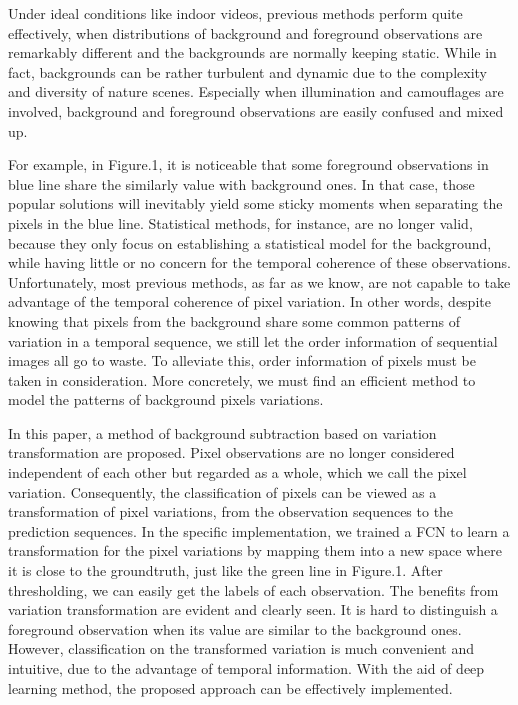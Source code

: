 \documentclass[journal]{IEEEtran}
\begin{document}
Under ideal conditions like indoor videos, previous methods perform quite effectively, when distributions of background and foreground observations are remarkably different and the backgrounds are normally keeping static. 
While in fact, backgrounds can be rather turbulent and dynamic due to the complexity and diversity of nature scenes. 
Especially when illumination and camouflages are involved, background and foreground observations are easily confused and mixed up. 


For example, in Figure.1, it is noticeable that some foreground observations in blue line share the similarly value with background ones. 
In that case, those popular solutions will inevitably yield some sticky moments when separating the pixels in the blue line. 
Statistical methods, for instance, are no longer valid, because they only focus on establishing a statistical model for the background, while having little or no concern for the temporal coherence of these observations. 
Unfortunately, most previous methods, as far as we know, are not capable to take advantage of the temporal coherence of pixel variation. 
In other words, despite knowing that pixels from the background share some common patterns of variation in a temporal sequence, we still let the order information of sequential images all go to waste. 
To alleviate this, order information of pixels must be taken in consideration. 
More concretely, we must find an efficient method to model the patterns of background pixels variations.

In this paper, a method of background subtraction based on variation transformation are proposed. 
Pixel observations are no longer considered independent of each other but regarded as a whole, which we call the pixel variation. 
Consequently, the classification of pixels can be viewed as a transformation of pixel variations, from the observation sequences to the prediction sequences. 
In the specific implementation, we trained a FCN to learn a transformation for the pixel variations by mapping them into a new space where it is close to the groundtruth, just like the green line in Figure.1. 
After thresholding, we can easily get the labels of each observation. 
The benefits from variation transformation are evident and clearly seen. 
It is hard to distinguish a foreground observation when its value are similar to the background ones. 
However, classification on the transformed variation is much convenient and intuitive, due to the advantage of temporal information. 
With the aid of deep learning method, the proposed approach can be effectively implemented.
\end{document}
